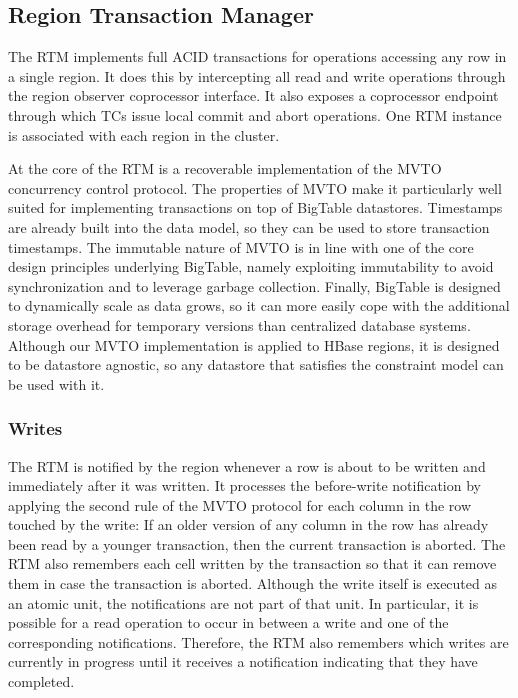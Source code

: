 \documentclass[10pt,final,journal]{IEEEtran}
\begin{document}
\subsection{Region Transaction Manager}
The RTM implements full ACID transactions for operations accessing any row in a single region. It does this by intercepting all read and write operations through the region observer coprocessor interface. It also exposes a coprocessor endpoint through which TCs issue local commit and abort operations. One RTM instance is associated with each region in the cluster.

At the core of the RTM is a recoverable implementation of the MVTO concurrency control protocol. The properties of MVTO make it particularly well suited for implementing transactions on top of BigTable datastores. Timestamps are already built into the data model, so they can be used to store transaction timestamps. The immutable nature of MVTO is in line with one of the core design principles underlying BigTable, namely exploiting immutability to avoid synchronization and to leverage garbage collection. Finally, BigTable is designed to dynamically scale as data grows, so it can more easily cope with the additional storage overhead for temporary versions than centralized database systems. Although our MVTO implementation is applied to HBase regions, it is designed to be datastore agnostic, so any datastore that satisfies the constraint model can be used with it.

\subsubsection{Writes}
The RTM is notified by the region whenever a row is about to be written and immediately after it was written. It processes the before-write notification by applying the second rule of the MVTO protocol for each column in the row touched by the write: If an older version of any column in the row has already been read by a younger transaction, then the current transaction is aborted. The RTM also remembers each cell written by the transaction so that it can remove them in case the transaction is aborted. Although the write itself is executed as an atomic unit, the notifications are not part of that unit. In particular, it is possible for a read operation to occur in between a write and one of the corresponding notifications. Therefore, the RTM also remembers which writes are currently in progress until it receives a notification indicating that they have completed.
\end{document}
